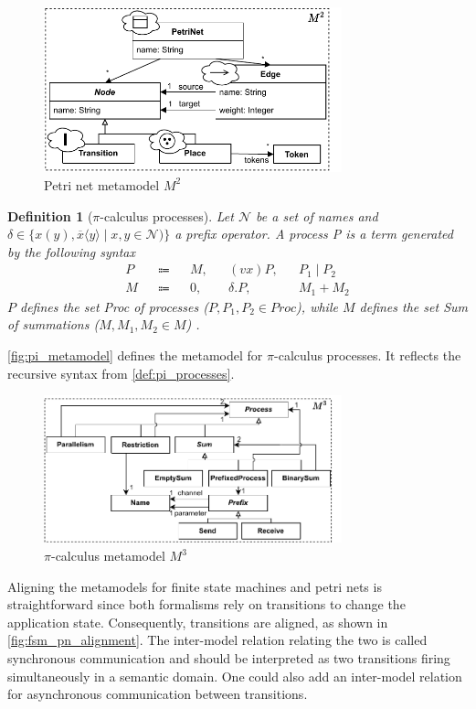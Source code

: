 \documentclass[conference]{IEEEtran}
\newtheorem{definition}{Definition}
\begin{document}
\begin{figure}[h]
    \centering
    \includegraphics[width=3.4in]{petri_net_metamodel}
    \caption{Petri net metamodel $M^2$}
    \label{fig:petri_net_metamodel}
\end{figure}

\begin{definition}[$\pi$-calculus processes] \label{def:pi_processes}
    Let $\mathcal{N}$ be a set of names and $\delta \in \{x(y),\overline{x}\langle y \rangle \mid x,y \in \mathcal{N})\}$ a prefix operator.
    A process P is a term generated by the following syntax
    \begin{align*}
        P && \Coloneqq && M, && (vx) P, && P_1 \mid P_2\\
        M && \Coloneqq && 0, && \delta.P, && M_1 + M_2
    \end{align*}
    $P$ defines the set \textit{Proc} of processes ($P, P_1, P_2 \in Proc$), while $M$ defines the set \textit{Sum} of summations ($M, M_1, M_2 \in M$) \cite{gadducciGraphRewritingPcalculus2007}.
\end{definition}

\autoref{fig:pi_metamodel} defines the metamodel for $\pi$-calculus processes.
It reflects the recursive syntax from \autoref{def:pi_processes}.

\begin{figure}[h]
    \centering
    \includegraphics[width=3.4in]{pi_metamodel}
    \caption{$\pi$-calculus metamodel $M^3$}
    \label{fig:pi_metamodel}
\end{figure}

Aligning the metamodels for finite state machines and petri nets is straightforward since both formalisms rely on transitions to change the application state.
Consequently, transitions are aligned, as shown in \autoref{fig:fsm_pn_alignment}.
The inter-model relation relating the two is called synchronous communication and should be interpreted as two transitions firing simultaneously in a semantic domain.
One could also add an inter-model relation for asynchronous communication between transitions.
\end{document}
